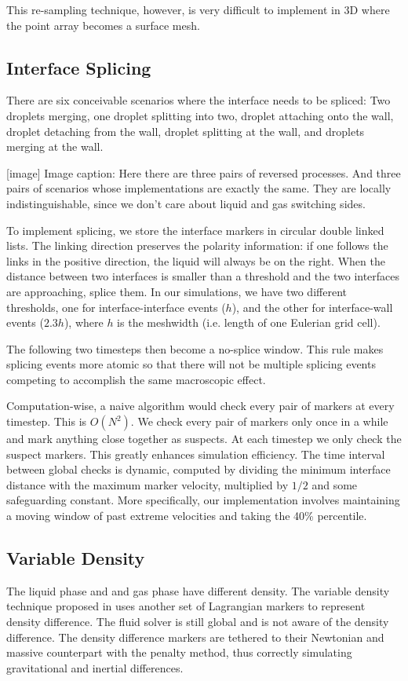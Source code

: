 \documentclass{jfm}
\begin{document}
This re-sampling technique, however, is very difficult to implement in 3D where the point array becomes a surface mesh.  

\subsection{Interface Splicing}
There are six conceivable scenarios where the interface needs to be spliced: Two droplets merging, one droplet splitting into two, droplet attaching onto the wall, droplet detaching from the wall, droplet splitting at the wall, and droplets merging at the wall. 

[image]
Image caption: Here there are three pairs of reversed processes. And three pairs of scenarios whose implementations are exactly the same. They are locally indistinguishable, since we don't care about liquid and gas switching sides. 

To implement splicing, we store the interface markers in circular double linked lists. The linking direction preserves the polarity information: if one follows the links in the positive direction, the liquid will always be on the right. When the distance between two interfaces is smaller than a threshold and the two interfaces are approaching, splice them. In our simulations, we have two different thresholds, one for interface-interface events ($h$), and the other for interface-wall events ($2.3h$), where $h$ is the meshwidth (i.e. length of one Eulerian grid cell). 

The following two timesteps then become a no-splice window. This rule makes splicing events more atomic so that there will not be multiple splicing events competing to accomplish the same macroscopic effect. 

Computation-wise, a naive algorithm would check every pair of markers at every timestep. This is $O(N^2)$. We check every pair of markers only once in a while and mark anything close together as suspects. At each timestep we only check the suspect markers. This greatly enhances simulation efficiency. The time interval between global checks is dynamic, computed by dividing the minimum interface distance with the maximum marker velocity, multiplied by $1/2$ and some safeguarding constant. More specifically, our implementation involves maintaining a moving window of past extreme velocities and taking the 40\% percentile. 

\subsection{Variable Density}
The liquid phase and and gas phase have different density. The variable density technique proposed in \cite{IBM_variable_density} uses another set of Lagrangian markers to represent density difference. The fluid solver is still global and is not aware of the density difference. The density difference markers are tethered to their Newtonian and massive counterpart with the penalty method, thus correctly simulating gravitational and inertial differences.
\end{document}
